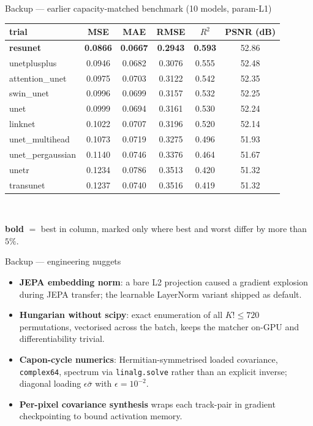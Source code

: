 \begin{frame}{Backup --- earlier capacity-matched benchmark (10 models, param-L1)}
  \small
  \begin{center}
  \begin{tabular}{@{}lccccc@{}}
    \toprule
    trial & MSE & MAE & RMSE & $R^2$ & PSNR (dB) \\
    \midrule
    \textbf{resunet} & \textbf{0.0866} & \textbf{0.0667} & \textbf{0.2943} & \textbf{0.593} & 52.86 \\
    unetplusplus     & 0.0946 & 0.0682 & 0.3076 & 0.555 & 52.48 \\
    attention\_unet  & 0.0975 & 0.0703 & 0.3122 & 0.542 & 52.35 \\
    swin\_unet       & 0.0996 & 0.0699 & 0.3157 & 0.532 & 52.25 \\
    unet             & 0.0999 & 0.0694 & 0.3161 & 0.530 & 52.24 \\
    linknet          & 0.1022 & 0.0707 & 0.3196 & 0.520 & 52.14 \\
    unet\_multihead  & 0.1073 & 0.0719 & 0.3275 & 0.496 & 51.93 \\
    unet\_pergaussian& 0.1140 & 0.0746 & 0.3376 & 0.464 & 51.67 \\
    unetr            & 0.1234 & 0.0786 & 0.3513 & 0.420 & 51.32 \\
    transunet        & 0.1237 & 0.0740 & 0.3516 & 0.419 & 51.32 \\
    \bottomrule
  \end{tabular}
  \\[3pt]
  {\scriptsize\color{soft} \textbf{bold} $=$ best in column, marked only where best and
   worst differ by more than $5\%$.\par}
  \end{center}
\end{frame}

\begin{frame}{Backup --- engineering nuggets}
  \small
  \begin{itemize}
    \item \textbf{JEPA embedding norm}: a bare L2 projection caused a gradient explosion
          during JEPA transfer; the learnable LayerNorm variant shipped as default.
    \item \textbf{Hungarian without scipy}: exact enumeration of all $K! \le 720$
          permutations, vectorised across the batch, keeps the matcher on-GPU and
          differentiability trivial.
    \item \textbf{Capon-cycle numerics}: Hermitian-symmetrised loaded covariance,
          \texttt{complex64}, spectrum via \texttt{linalg.solve} rather than an explicit
          inverse; diagonal loading $\epsilon\bar\sigma$ with $\epsilon = 10^{-2}$.
    \item \textbf{Per-pixel covariance synthesis} wraps each track-pair in gradient
          checkpointing to bound activation memory.
  \end{itemize}
\end{frame}

